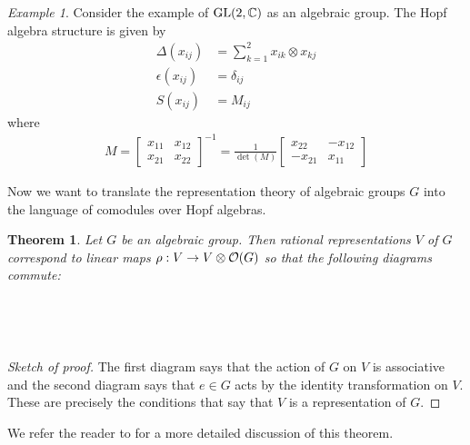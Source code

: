 \documentclass{amsart}
\numberwithin{equation}{section}
\theoremstyle{plain} %
\newtheorem{theorem}[equation]{Theorem}
\theoremstyle{definition}
\theoremstyle{remark}
\newtheorem{example}[equation]{Example}
\begin{document}
\begin{example}
	Consider the example of $\operatorname{GL}(2,\mathbb{C})$ as an algebraic group. The Hopf algebra structure is given by
	\begin{align*}
		\Delta(x_{ij})   & = \sum_{k=1}^2 x_{ik}\otimes x_{kj} \\
		\epsilon(x_{ij}) & = \delta_{ij}                       \\
		S(x_{ij})        & = M_{ij}
	\end{align*} where \begin{align*}
		M = \begin{bmatrix}
			    x_{11} & x_{12} \\
			    x_{21} & x_{22}
		    \end{bmatrix}^{-1} = \frac{1}{\det(M)}\begin{bmatrix}
			                                          x_{22}  & -x_{12} \\
			                                          -x_{21} & x_{11}
		                                          \end{bmatrix}
	\end{align*}
\end{example}

\hfill

Now we want to translate the representation theory of algebraic groups $G$
into the language of comodules over Hopf algebras.
\begin{theorem}
	Let $G$ be an algebraic group. Then rational representations $V$ of $G$
	correspond to linear maps $\rho: V\to V\otimes \mathcal{O}(G)$ so that the following diagrams commute:
	\begin{center}
		 \\

		 \\
	\end{center}
\end{theorem}
\begin{proof}
	[Sketch of proof] The first diagram says that the action of $G$ on $V$ is associative
	and the second diagram says that $e\in G$ acts by the identity transformation on $V$.
	These are precisely the conditions that say that $V$ is a representation of $G$.
\end{proof}
We refer the reader to \cite{waterhouse} for a more detailed discussion of this theorem.
\end{document}
